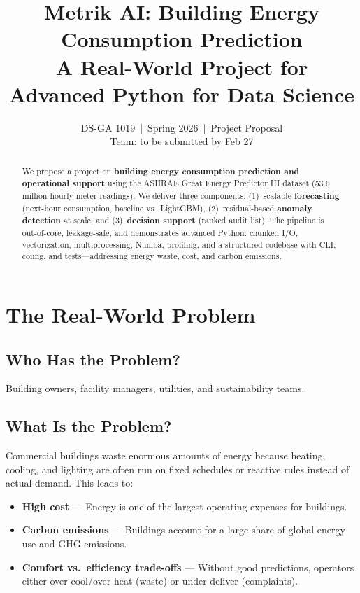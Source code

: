 \documentclass[11pt,a4paper]{article}
\title{\textbf{Metrik AI: Building Energy Consumption Prediction}\\[0.5em]
\large A Real-World Project for Advanced Python for Data Science}
\author{DS-GA 1019 \,|\, Spring 2026 \,|\, Project Proposal\\[0.5em]
\small Team: to be submitted by Feb 27}
\date{}
\begin{document}
\maketitle

\begin{abstract}
We propose a project on \textbf{building energy consumption prediction and operational support} using the ASHRAE Great Energy Predictor III dataset (53.6 million hourly meter readings). We deliver three components: (1)~scalable \textbf{forecasting} (next-hour consumption, baseline vs.\ LightGBM), (2)~residual-based \textbf{anomaly detection} at scale, and (3)~\textbf{decision support} (ranked audit list). The pipeline is out-of-core, leakage-safe, and demonstrates advanced Python: chunked I/O, vectorization, multiprocessing, Numba, profiling, and a structured codebase with CLI, config, and tests---addressing energy waste, cost, and carbon emissions.
\end{abstract}

\section{The Real-World Problem}

\subsection{Who Has the Problem?}
Building owners, facility managers, utilities, and sustainability teams.

\subsection{What Is the Problem?}
Commercial buildings waste enormous amounts of energy because heating, cooling, and lighting are often run on fixed schedules or reactive rules instead of actual demand. This leads to:
\begin{itemize}[noitemsep]
    \item \textbf{High cost} --- Energy is one of the largest operating expenses for buildings.
    \item \textbf{Carbon emissions} --- Buildings account for a large share of global energy use and GHG emissions.
    \item \textbf{Comfort vs.\ efficiency trade-offs} --- Without good predictions, operators either over-cool/over-heat (waste) or under-deliver (complaints).
\end{itemize}
\end{document}
